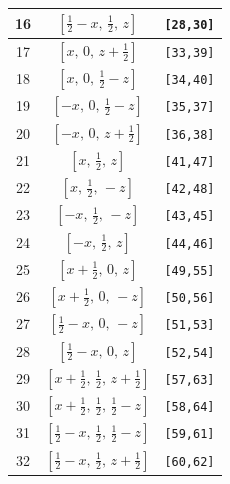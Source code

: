 \documentclass[fleqn,8pt]{jsarticle}
\begin{document}
\begin{longtable}{ccc}
16 & $\left[ \frac{1}{2} - x,\, \frac{1}{2},\, z \right]$ & {\tt [28,30]} \\ \hline
17 & $\left[ x,\, 0,\, z + \frac{1}{2} \right]$ & {\tt [33,39]} \\ \hline
18 & $\left[ x,\, 0,\, \frac{1}{2} - z \right]$ & {\tt [34,40]} \\ \hline
19 & $\left[ - x,\, 0,\, \frac{1}{2} - z \right]$ & {\tt [35,37]} \\ \hline
20 & $\left[ - x,\, 0,\, z + \frac{1}{2} \right]$ & {\tt [36,38]} \\ \hline
21 & $\left[ x,\, \frac{1}{2},\, z \right]$ & {\tt [41,47]} \\ \hline
22 & $\left[ x,\, \frac{1}{2},\, - z \right]$ & {\tt [42,48]} \\ \hline
23 & $\left[ - x,\, \frac{1}{2},\, - z \right]$ & {\tt [43,45]} \\ \hline
24 & $\left[ - x,\, \frac{1}{2},\, z \right]$ & {\tt [44,46]} \\ \hline
25 & $\left[ x + \frac{1}{2},\, 0,\, z \right]$ & {\tt [49,55]} \\ \hline
26 & $\left[ x + \frac{1}{2},\, 0,\, - z \right]$ & {\tt [50,56]} \\ \hline
27 & $\left[ \frac{1}{2} - x,\, 0,\, - z \right]$ & {\tt [51,53]} \\ \hline
28 & $\left[ \frac{1}{2} - x,\, 0,\, z \right]$ & {\tt [52,54]} \\ \hline
29 & $\left[ x + \frac{1}{2},\, \frac{1}{2},\, z + \frac{1}{2} \right]$ & {\tt [57,63]} \\ \hline
30 & $\left[ x + \frac{1}{2},\, \frac{1}{2},\, \frac{1}{2} - z \right]$ & {\tt [58,64]} \\ \hline
31 & $\left[ \frac{1}{2} - x,\, \frac{1}{2},\, \frac{1}{2} - z \right]$ & {\tt [59,61]} \\ \hline
32 & $\left[ \frac{1}{2} - x,\, \frac{1}{2},\, z + \frac{1}{2} \right]$ & {\tt [60,62]} \\
\end{longtable}
\renewcommand{\arraystretch}{1.2}
\end{document}
